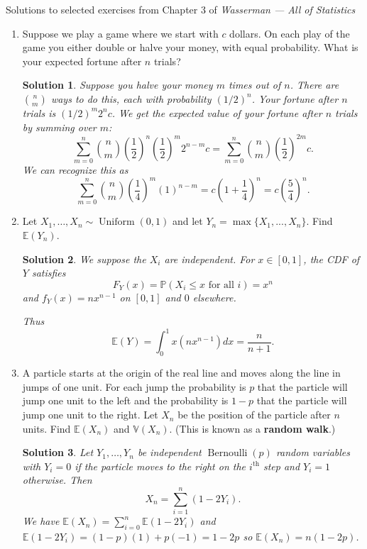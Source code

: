 \documentclass[10pt]{article}
\newtheorem*{sol}{Solution}
\renewcommand{\P}{\mathbb{P}}
\newcommand{\V}{\mathbb{V}}
\newcommand{\E}{\mathbb{E}}
\newcommand{\Unif}{\operatorname{Uniform}}
\newcommand{\Bern}{\operatorname{Bernoulli}}
\begin{document}
\noindent \large{Solutions to selected exercises from Chapter 3 of
\emph{Wasserman --- All of Statistics}}

\begin{enumerate}
\item[(1)]
Suppose we play a game where we start with $c$ dollars. On each play of
the game you either double or halve your money, with equal probability.
What is your expected fortune after $n$ trials?

\begin{sol}
Suppose you halve your money $m$ times out of $n$. There are $\binom{n}{m}$
ways to do this, each with probability $(1/2)^n$. Your fortune after $n$
trials is $(1/2)^m2^nc$. We get the expected value of your fortune after $n$
trials by summing over $m$:
\[
\sum_{m=0}^n \binom{n}{m}\left(\frac{1}{2}\right)^n \left(\frac{1}{2}\right)^m2^{n-m}c
= \sum_{m=0}^n \binom{n}{m} \left(\frac{1}{2}\right)^{2m}c.
\]
We can recognize this as
\[
\sum_{m=0}^n \binom{n}{m} \left(\frac{1}{4}\right)^m(1)^{n-m} =
c\left(1+\frac{1}{4}\right)^n = c\left(\frac{5}{4}\right)^n.
\]
\end{sol}

\item[(3)]
Let $X_1, \ldots ,X_n \sim \Unif(0,1)$ and let $Y_n = \max\{X_1, ... ,X_n\}$. Find
$\E(Y_n)$.

\begin{sol}
We suppose the $X_i$ are independent. For $x\in [0,1]$, the CDF of $Y$ satisfies
\[
F_Y(x)=\P(X_i\leq x \text{ for all } i)=x^n
\]
and $f_Y(x) = nx^{n-1}$ on $[0,1]$ and $0$ elsewhere.

Thus
\[
\E(Y) = \int_0^1 x (n x^{n-1}) dx =\frac{n}{n+1}.
\]
\end{sol}

\item[(4)]
A particle starts at the origin of the real line and moves along the line in
jumps of one unit. For each jump the probability is $p$ that the particle
will jump one unit to the left and the probability is $1-p$ that the particle
will jump one unit to the right. Let $X_n$ be the position of the particle
after $n$ units. Find $\E(X_n)$ and $\V(X_n)$. (This is known as a \textbf{random
walk}.)

\begin{sol}
Let $Y_1,\ldots,Y_n$ be independent $\Bern(p)$ random variables with $Y_i=0$
if the particle moves to the right on the $i^{\text{th}}$ step and $Y_i=1$
otherwise. Then
\[
X_n = \sum_{i=1}^n (1-2Y_i).
\]
We have $\E(X_n) = \sum_{i=0}^n \E(1-2Y_i)$ and
$\E(1-2Y_i) = (1-p)(1) + p(-1)=1-2p$ so $\E(X_n)=n(1-2p)$.


\end{sol}
\end{enumerate}
\end{document}
